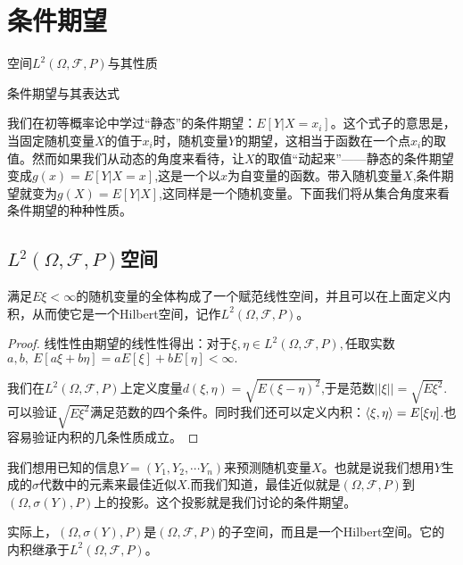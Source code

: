 \documentclass[lang=cn,10pt]{elegantbook}
\begin{document}
	\chapter{条件期望}
	\begin{introduction}
		\item 空间\(L^2(\Omega,\mathcal{F},P)\)与其性质
		\item 条件期望与其表达式
	\end{introduction}
	我们在初等概率论中学过“静态”的条件期望：\(E[Y|X=x_i]\)。这个式子的意思是，当固定随机变量\(X\)的值于\(x_i\)时，随机变量\(Y\)的期望，这相当于函数在一个点\(x_i\)的取值。然而如果我们从动态的角度来看待，让\(X\)的取值“动起来”——静态的条件期望变成\(g(x)=E[Y|X=x]\),这是一个以\(x\)为自变量的函数。带入随机变量\(X\),条件期望就变为\(g(X)=E[Y|X]\),这同样是一个随机变量。下面我们将从集合角度来看条件期望的种种性质。
	\section{\(L^2(\Omega,\mathcal{F},P)\)空间}
	\begin{definition}
		满足\(E\xi<\infty\)的随机变量的全体构成了一个赋范线性空间，并且可以在上面定义内积，从而使它是一个Hilbert空间，记作\(L^2(\Omega,\mathcal{F},P)\)。
	\end{definition}
	\begin{proof}
		线性性由期望的线性性得出：对于\(\xi,\eta\in L^2(\Omega,\mathcal{F},P),\)任取实数\(a,b,\ E[a\xi +b\eta]=aE[\xi]+bE[\eta]<\infty.\)
		
		我们在\(L^2(\Omega,\mathcal{F},P)\)上定义度量\(d(\xi,\eta)=\sqrt{E(\xi-\eta)^2}\),于是范数\(||\xi||=\sqrt{E\xi^2}\).可以验证\(\sqrt{E\xi^2}\)满足范数的四个条件。同时我们还可以定义内积：\(\Braket{\xi,\eta}=E[\xi\eta]\).也容易验证内积的几条性质成立。
	\end{proof}
	我们想用已知的信息\(Y=(Y_1,Y_2,\cdots Y_n)\)来预测随机变量\(X\)。也就是说我们想用\(Y\)生成的\(\sigma\)代数中的元素来最佳近似\(X\).而我们知道，最佳近似就是\((\Omega,\mathcal{F},P)\)到\((\Omega,\sigma(Y),P)\)上的投影。这个投影就是我们讨论的条件期望。
	
	实际上，\((\Omega,\sigma(Y),P)\)是\((\Omega,\mathcal{F},P)\)的子空间，而且是一个Hilbert空间。它的内积继承于\(L^2(\Omega,\mathcal{F},P)\)。
	
\end{document}
